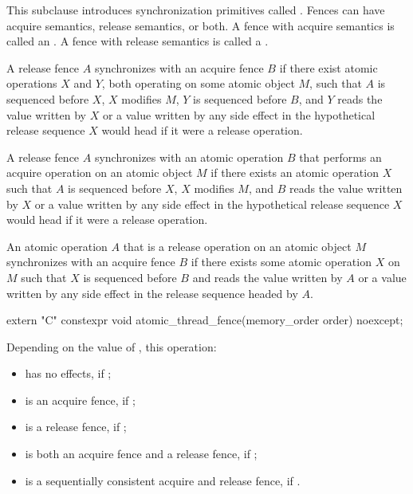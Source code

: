 \pnum
This subclause introduces synchronization primitives called . Fences can have
acquire semantics, release semantics, or both. A fence with acquire semantics is called
an . A fence with release semantics is called a .

\pnum
A release fence $A$ synchronizes with an acquire fence $B$ if there exist
atomic operations $X$ and $Y$, both operating on some atomic object
$M$, such that $A$ is sequenced before $X$, $X$ modifies
$M$, $Y$ is sequenced before $B$, and $Y$ reads the value
written by $X$ or a value written by any side effect in the hypothetical release
sequence $X$ would head if it were a release operation.

\pnum
A release fence $A$ synchronizes with an atomic operation $B$ that
performs an acquire operation on an atomic object $M$ if there exists an atomic
operation $X$ such that $A$ is sequenced before $X$, $X$
modifies $M$, and $B$ reads the value written by $X$ or a value
written by any side effect in the hypothetical release sequence $X$ would head if
it were a release operation.

\pnum
An atomic operation $A$ that is a release operation on an atomic object
$M$ synchronizes with an acquire fence $B$ if there exists some atomic
operation $X$ on $M$ such that $X$ is sequenced before $B$
and reads the value written by $A$ or a value written by any side effect in the
release sequence headed by $A$.

%
\begin{itemdecl}
extern "C" constexpr void atomic_thread_fence(memory_order order) noexcept;
\end{itemdecl}

\begin{itemdescr}
\pnum
\effects
Depending on the value of , this operation:
\begin{itemize}
\item has no effects, if ;

\item is an acquire fence, if ;

\item is a release fence, if ;

\item is both an acquire fence and a release fence, if ;

\item is a sequentially consistent acquire and release fence, if .
\end{itemize}
\end{itemdescr}

